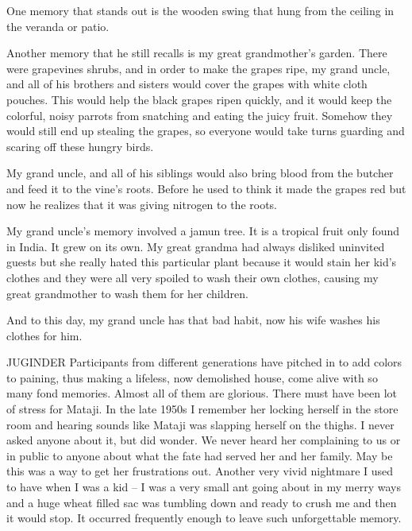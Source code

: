 One memory that stands out is the wooden swing that hung from the ceiling in the veranda or patio.

Another memory that he still recalls is my great grandmother’s garden. There were grapevines shrubs, and in order to make the grapes ripe, my grand uncle, and all of his brothers and sisters would cover the grapes with white cloth pouches. This would help the black grapes ripen quickly, and it would keep the colorful, noisy parrots from snatching and eating the juicy fruit. Somehow they would still end up stealing the grapes, so everyone would take turns guarding and scaring off these hungry birds.

My grand uncle, and all of his siblings would also bring blood from the butcher and feed it to the vine’s roots. Before he used to think it made the grapes red but now he realizes that it was giving nitrogen to the roots.

My grand uncle’s memory involved a jamun tree. It is a tropical fruit only found in India. It grew on its own. My great grandma had always disliked uninvited guests but she really hated this particular plant because it would stain her kid’s clothes and they were all very spoiled to wash their own clothes, causing my great grandmother to wash them for her children.

And to this day, my grand uncle has that bad habit, now his wife washes his clothes for him.

JUGINDER
Participants from different generations have pitched in to add colors to paining, thus making a lifeless, now demolished house, come alive with so many fond memories. Almost all of them are glorious. There must have been lot of stress for Mataji. In the late 1950s I remember her locking herself in the store room and hearing sounds like Mataji was slapping herself on the thighs. I never asked anyone about it, but did wonder. We never heard her complaining to us or in public to anyone about what the fate had served her and her family. May be this was a way to get her frustrations out. Another very vivid nightmare I used to have when I was a kid – I was a very small ant going about in my merry ways and a huge wheat filled sac was tumbling down and ready to crush me and then it would stop. It occurred frequently enough to leave such unforgettable memory. 
